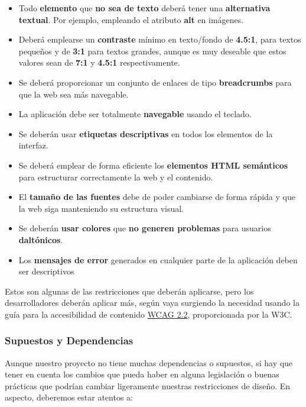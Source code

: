 \begin{itemize}
	\item Todo \textbf{elemento} que \textbf{no sea de texto} deberá tener una \textbf{alternativa textual}. Por ejemplo, empleando el atributo \textbf{alt} en imágenes.
	
	\item Deberá emplearse un \textbf{contraste} mínimo en texto/fondo de \textbf{4.5:1}, para textos pequeños y de \textbf{3:1} para textos grandes, aunque es muy deseable que estos valores sean de \textbf{7:1} y \textbf{4.5:1} respectivamente.
	
	\item Se deberá proporcionar un conjunto de enlaces de tipo \textbf{breadcrumbs} para que la web sea más navegable.
	
	\item La aplicación debe ser totalmente \textbf{navegable} usando el teclado.
	
	\item Se deberán usar \textbf{etiquetas descriptivas} en todos los elementos de la interfaz.
	
	\item Se deberá emplear de forma eficiente los \textbf{elementos HTML semánticos} para estructurar correctamente la web y el contenido.
	
	\item El \textbf{tamaño de las fuentes} debe de poder cambiarse de forma rápida y que la web siga manteniendo su estructura visual.
	
	\item Se deberán \textbf{usar colores} que \textbf{no generen problemas} para usuarios \textbf{daltónicos}.
	
	\item Los \textbf{mensajes de error} generados en cualquier parte de la aplicación deben ser descriptivos
\end{itemize}

Estos son algunas de las restricciones que deberán aplicarse, pero los desarrolladores deberán aplicar más, según vaya surgiendo la necesidad usando la guía para la accesibilidad de contenido \href{https://www.w3.org/TR/WCAG22/}{WCAG 2.2}, proporcionada por la W3C.

\subsubsection{Supuestos y Dependencias}
Aunque nuestro proyecto no tiene muchas dependencias o supuestos, si hay que tener en cuenta los cambios que pueda haber en alguna legislación o buenas prácticas que podrían cambiar ligeramente nuestras restricciones de diseño. En aspecto, deberemos estar atentos a:

